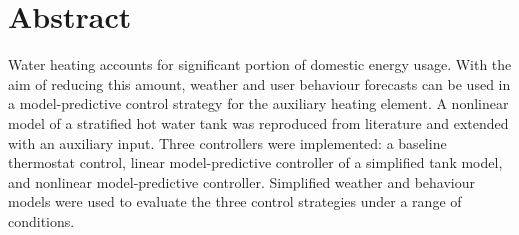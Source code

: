 \chapter{Abstract}

Water heating accounts for significant portion of domestic energy usage.
With the aim of reducing this amount, weather and user behaviour forecasts can be used in a model-predictive control strategy for the auxiliary heating element.
A nonlinear model of a stratified hot water tank was reproduced from literature and extended with an auxiliary input.
Three controllers were implemented: a baseline thermostat control, linear model-predictive controller of a simplified tank model, and nonlinear model-predictive controller.
Simplified weather and behaviour models were used to evaluate the three control strategies under a range of conditions.
